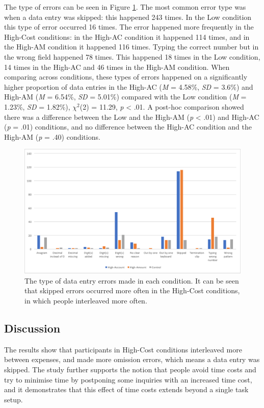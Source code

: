 The type of errors can be seen in Figure \ref{fig:ch34_5-typeoferrors}. The most common error type was when a data entry was skipped: this happened 243 times. %
In the Low condition this type of error occurred 16 times. The error happened more frequently in the High-Cost conditions: in the High-AC condition it happened 114 times, and in the High-AM condition it happened 116 times.
Typing the correct number but in the wrong field happened 78 times. This happened 18 times in the Low condition, 14 times in the High-AC and 46 times in the High-AM condition.
When comparing across conditions, these types of errors happened on a significantly higher proportion of data entries in the High-AC (\textit{M} = 4.58\%, \textit{SD} = 3.6\%) and High-AM (\textit{M} = 6.54\%, \textit{SD} = 5.01\%) compared with the Low condition (\textit{M} = 1.23\%, \textit{SD} = 1.82\%),  $\chi^2$(2) = 11.29, \textit{p} < .01.  A post-hoc comparison showed there was a difference between the Low and the High-AM (\textit{p} < .01) and High-AC (\textit{p} = .01) conditions, and no difference between the High-AC condition and the High-AM (\textit{p} = .40) conditions.

\begin{figure}
\includegraphics[width=\textwidth]{images/ch34/ch34-5_TypeofErrors.pdf}
    \caption[Study 5 type of data entry errors]{The type of data entry errors made in each condition. It can be seen that skipped errors occurred more often in the High-Cost conditions, in which people interleaved more often.}\label{fig:ch34_5-typeoferrors}
\end{figure}

\subsection{Discussion}
The results show that participants in High-Cost conditions interleaved more between expenses, and made more omission errors, which means a data entry was skipped. The study further supports the notion that people avoid time costs and try to minimise time by postponing some inquiries with an increased time cost, and it demonstrates that this effect of time costs extends beyond a single task setup.


